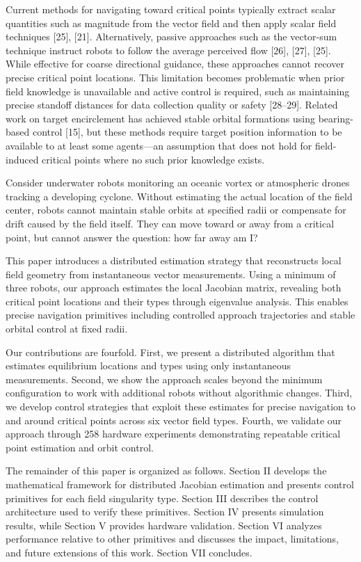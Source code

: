 \documentclass[lettersize,journal]{IEEEtran}
\begin{document}
Current methods for navigating toward critical points typically extract scalar quantities such as magnitude from the vector field and then apply scalar field techniques [25], [21]. Alternatively, passive approaches such as the vector-sum technique instruct robots to follow the average perceived flow [26], [27], [25]. While effective for coarse directional guidance, these approaches cannot recover precise critical point locations. This limitation becomes problematic when prior field knowledge is unavailable and active control is required, such as maintaining precise standoff distances for data collection quality or safety [28--29]. Related work on target encirclement has achieved stable orbital formations using bearing-based control [15], but these methods require target position information to be available to at least some agents—an assumption that does not hold for field-induced critical points where no such prior knowledge exists.

Consider underwater robots monitoring an oceanic vortex or atmospheric drones tracking a developing cyclone. Without estimating the actual location of the field center, robots cannot maintain stable orbits at specified radii or compensate for drift caused by the field itself. They can move toward or away from a critical point, but cannot answer the question: how far away am I?

This paper introduces a distributed estimation strategy that reconstructs local field geometry from instantaneous vector measurements. Using a minimum of three robots, our approach estimates the local Jacobian matrix, revealing both critical point locations and their types through eigenvalue analysis. This enables precise navigation primitives including controlled approach trajectories and stable orbital control at fixed radii.

Our contributions are fourfold. First, we present a distributed algorithm that estimates equilibrium locations and types using only instantaneous measurements. Second, we show the approach scales beyond the minimum configuration to work with additional robots without algorithmic changes. Third, we develop control strategies that exploit these estimates for precise navigation to and around critical points across six vector field types. Fourth, we validate our approach through 258 hardware experiments demonstrating repeatable critical point estimation and orbit control.

The remainder of this paper is organized as follows. Section II develops the mathematical framework for distributed Jacobian estimation and presents control primitives for each field singularity type. Section III describes the control architecture used to verify these primitives. Section IV presents simulation results, while Section V provides hardware validation. Section VI analyzes performance relative to other primitives and discusses the impact, limitations, and future extensions of this work. Section VII concludes.
\end{document}
